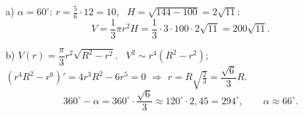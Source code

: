 a) $\alpha=60^\circ$: $r=\frac56\cdot12=10$, \ $H=\sqrt{144-100}=2\sqrt{11}$:
\[V=\frac13\pi r^2H=\frac13\cdot3\cdot100\cdot2\sqrt{11}=200\sqrt{11}.\]

b) $V(r)=\dfrac\pi3r^2\sqrt{R^2-r^2}$. \ $V^2\sim r^4\left(R^2-r^2\right)$; \ $\left(r^4R^2-r^6\right)'=4r^3R^2-6r^5=0$ $\Rightarrow$ $r=R\sqrt{\frac23}=\dfrac{\sqrt6}3R$.
\[360^\circ-\alpha=360^\circ\cdot\frac{\sqrt6}3\approx120^\circ\cdot2{,}45=294^\circ,\qquad \alpha\approx66^\circ.\]

\ShowJavoblar

